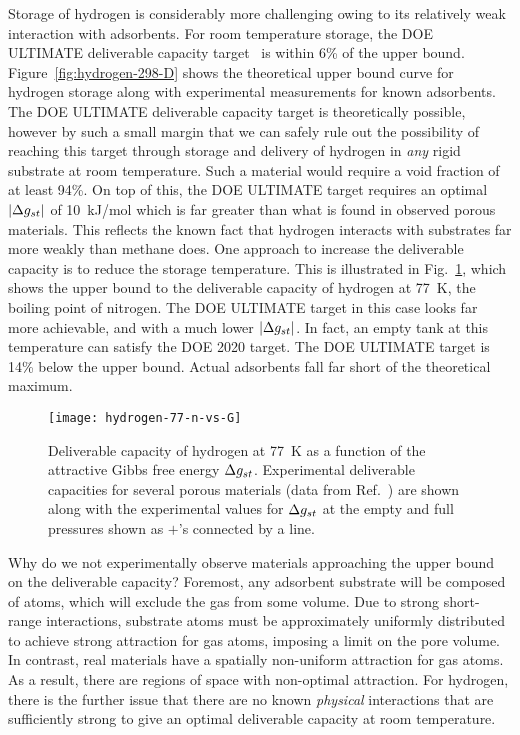 Storage of hydrogen is considerably more challenging owing to its relatively
weak interaction with adsorbents. For room temperature storage, the DOE
ULTIMATE deliverable capacity target~\cite{DOE} is within 6\% of the upper
bound. Figure~\ref{fig:hydrogen-298-D} shows the theoretical upper bound curve
for hydrogen storage along with experimental measurements for known adsorbents. The
DOE ULTIMATE deliverable capacity target is theoretically possible, however by
such a small margin that we can safely rule out the possibility of reaching
this target through storage and delivery of hydrogen in \emph{any} rigid
substrate at room temperature. Such a material would require a void fraction of
at least 94\%. On top of this, the DOE ULTIMATE target requires an optimal
$|\Delta g_{st}|$ of 10~kJ/mol which is far greater than what is found in observed
porous materials. This reflects the known fact that hydrogen interacts with
substrates far more weakly than methane does. 
One approach to increase the deliverable capacity is to reduce the storage
temperature. This is illustrated in Fig.~\ref{fig:hydrogen-77-D}, which shows
the upper bound to the deliverable capacity of hydrogen at 77\ K, the boiling
point of nitrogen. The DOE ULTIMATE target in this case looks far more
achievable, and with a much lower $|\Delta g_{st}|$. In fact, an empty tank at this
temperature can satisfy the DOE 2020 target. The DOE ULTIMATE target is 14\%
below the upper bound. Actual adsorbents fall far short of the theoretical maximum.

\begin{figure}
    \centering
    \texttt{[image: hydrogen-77-n-vs-G]}
    \caption{Deliverable capacity of hydrogen at 77\ K as a function of the attractive Gibbs free energy $\Delta g_{st}$. Experimental deliverable capacities for several porous materials (data from Ref.~\cite{garcia2018benchmark}) are shown along with the experimental values for $\Delta g_{st}$ at the empty and full pressures shown as $+$'s connected by a line.}
    \label{fig:hydrogen-77-D}
\end{figure}

Why do we not experimentally observe materials approaching the upper bound on
the deliverable capacity? Foremost, any adsorbent substrate will be composed of
atoms, which will exclude the gas from some volume. Due to strong short-range
interactions, substrate atoms must be approximately uniformly distributed to achieve strong
attraction for gas atoms, imposing a limit on the pore
volume. In contrast, real materials have a spatially non-uniform attraction for
gas atoms. As a result, there are regions of space with
non-optimal attraction. For hydrogen, there is the further issue that there are
no known \emph{physical} interactions that are sufficiently strong to give an
optimal deliverable capacity at room temperature.

